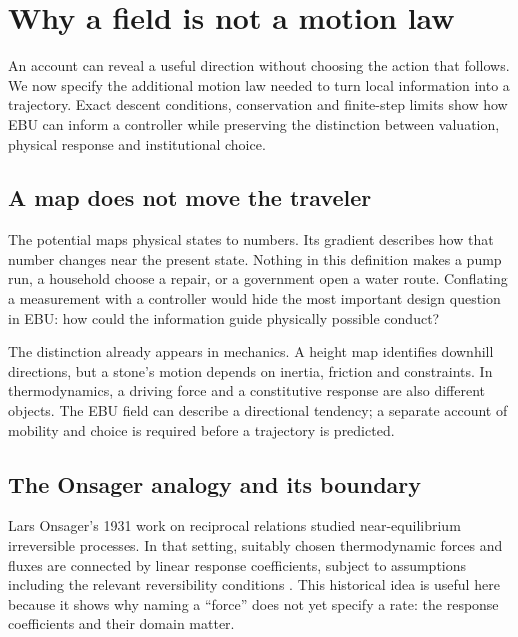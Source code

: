 \chapter{Why a field is not a motion law}\label{ch:motion-law}

An account can reveal a useful direction without choosing the action that follows. We now specify the additional motion law needed to turn local information into a trajectory. Exact descent conditions, conservation and finite-step limits show how EBU can inform a controller while preserving the distinction between valuation, physical response and institutional choice.


\section{A map does not move the traveler}
The potential maps physical states to numbers. Its gradient describes how that number changes near the present state. Nothing in this definition makes a pump run, a household choose a repair, or a government open a water route. Conflating a measurement with a controller would hide the most important design question in EBU: how could the information guide physically possible conduct?

The distinction already appears in mechanics. A height map identifies downhill directions, but a stone's motion depends on inertia, friction and constraints. In thermodynamics, a driving force and a constitutive response are also different objects. The EBU field can describe a directional tendency; a separate account of mobility and choice is required before a trajectory is predicted.

\section{The Onsager analogy and its boundary}
Lars Onsager's 1931 work on reciprocal relations studied near-equilibrium irreversible processes. In that setting, suitably chosen thermodynamic forces and fluxes are connected by linear response coefficients, subject to assumptions including the relevant reversibility conditions \cite{onsager-one,onsager-two}. This historical idea is useful here because it shows why naming a ``force'' does not yet specify a rate: the response coefficients and their domain matter.

